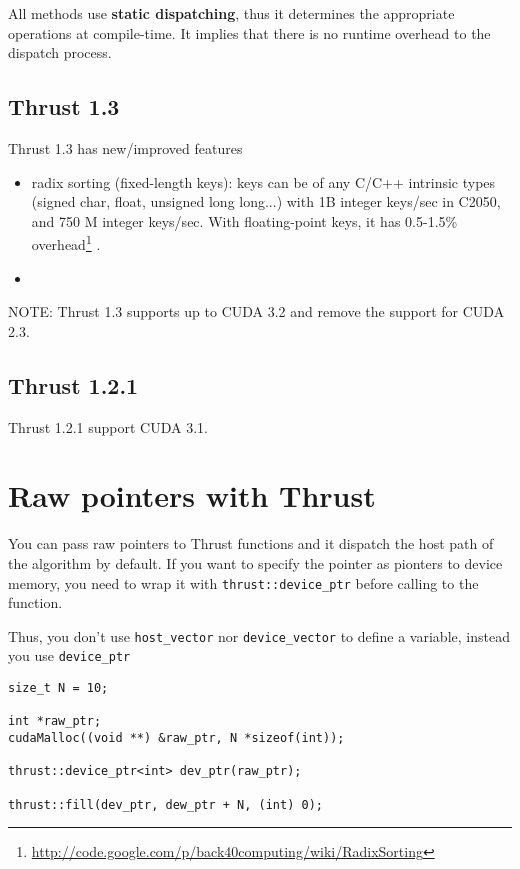 All methods use {\bf static dispatching}, thus it determines the
appropriate operations at compile-time. It implies that there is no
runtime overhead to the dispatch process.

\subsection{Thrust 1.3}
\label{sec:thrust-1.3}

Thrust 1.3 has new/improved features
\begin{itemize}
\item radix sorting (fixed-length keys): keys can be of any C/C++
  intrinsic types (signed char, float, unsigned long long...) with 1B
  integer keys/sec in C2050, and 750 M integer keys/sec. With
  floating-point keys, it has 0.5-1.5\%
  overhead\footnote{\url{http://code.google.com/p/back40computing/wiki/RadixSorting}}
  . 
\item 
\end{itemize}

NOTE: Thrust 1.3 supports up to CUDA 3.2 and remove the support for
CUDA 2.3. 

\subsection{Thrust 1.2.1}
\label{sec:thrust-1.2.1}

Thrust 1.2.1 support CUDA 3.1. 

\section{Raw pointers with Thrust}

You can pass raw pointers to Thrust functions and it dispatch the host
path of the algorithm by default. If you want to specify the pointer
as pionters to device memory, you need to wrap it with
\verb!thrust::device_ptr! before calling to the function.

Thus, you don't use \verb!host_vector! nor \verb!device_vector! to
define a variable, instead you use \verb!device_ptr!
\begin{lstlisting}
size_t N = 10;

int *raw_ptr; 
cudaMalloc((void **) &raw_ptr, N *sizeof(int));

thrust::device_ptr<int> dev_ptr(raw_ptr);

thrust::fill(dev_ptr, dew_ptr + N, (int) 0);
\end{lstlisting}

